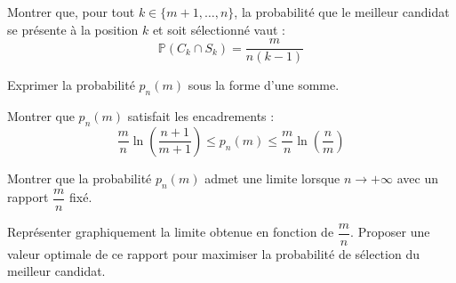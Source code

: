 \documentclass[10pt,a4paper]{article}
\begin{document}
\q Montrer que, pour tout \( k \in \{m+1, \dots, n\} \), la probabilité que le meilleur candidat se
présente à la position \( k \) et soit sélectionné vaut :
\[
\mathbb{P}(C_k \cap S_k) = \frac{m}{n(k-1)}
\]

\q Exprimer la probabilité \( p_n(m) \) sous la forme d'une somme.

\q Montrer que \( p_n(m) \) satisfait les encadrements :
\[
\dfrac{m}{n} \ln\left( \dfrac{n+1}{m+1} \right) \leq p_n(m) \leq \dfrac{m}{n} \ln\left( \dfrac{n}{m} \right)
\]

\q Montrer que la probabilité \( p_n(m) \) admet une limite lorsque \( n \to +\infty \) avec un
rapport \( \dfrac{m}{n} \) fixé.

\q Représenter graphiquement la limite obtenue en fonction de \( \dfrac{m}{n} \). Proposer une
valeur optimale de ce rapport pour maximiser la probabilité de sélection du meilleur candidat.
\end{document}
